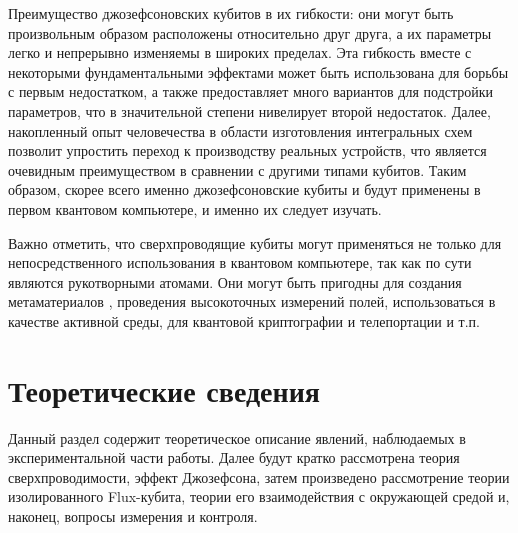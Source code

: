 \documentclass[12pt]{article}
\numberwithin{equation}{section}
\begin{document}
Преимущество джозефсоновских кубитов в их гибкости: они могут быть произвольным образом расположены относительно друг друга, а их параметры легко и непрерывно изменяемы в широких пределах. Эта гибкость вместе с некоторыми фундаментальными эффектами\cite{Koch2007} может быть использована для борьбы с первым недостатком, а также предоставляет много вариантов для подстройки параметров, что в значительной степени нивелирует второй недостаток. Далее, накопленный опыт человечества в области изготовления интегральных схем позволит упростить переход к производству реальных устройств, что является очевидным преимуществом в сравнении с другими типами кубитов. Таким образом, скорее всего именно джозефсоновские кубиты и будут применены в первом квантовом компьютере, и именно их следует изучать.

Важно отметить, что сверхпроводящие кубиты могут применяться не только для непосредственного использования в квантовом компьютере, так как по сути являются рукотворными атомами. Они могут быть пригодны для создания метаматериалов \cite{Macha2014}, проведения высокоточных измерений полей\cite{Clarke2006}, использоваться в качестве активной среды\cite{Astafiev2010}, для квантовой криптографии и телепортации \cite{Xia2014} и т.п. 
\newpage
\part{Теоретические сведения}
Данный раздел содержит теоретическое описание явлений, наблюдаемых в экспериментальной части работы. Далее будут кратко рассмотрена теория сверхпроводимости, эффект Джозефсона, затем произведено рассмотрение теории изолированного Flux-кубита, теории его взаимодействия с окружающей средой и, наконец, вопросы измерения и контроля. 
\end{document}
